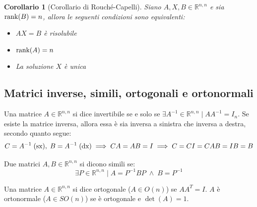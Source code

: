 \documentclass{article}
\newtheorem{corollary}{Corollario}
\begin{document}
    \vspace{10pt}
    \begin{corollary}[Corollario di Rouché-Capelli]
        Siano $A, X, B \in \mathbb{R}^{n, n}$ e sia $\textnormal{rank}(B) = n$, allora le seguenti condizioni sono equivalenti:
        \begin{itemize}
            \item $AX = B$ è risolubile
            \item $\textnormal{rank}(A) = n$
            \item La soluzione $X$ è unica 
        \end{itemize}
    \end{corollary}


\vspace{10pt}
\subsection{Matrici inverse, simili, ortogonali e ortonormali}
    Una matrice $A \in \mathbb{R}^{n, n}$ si dice invertibile se e solo se $\exists A^{-1} \in \mathbb{R}^{n, n} \; | \; AA^{-1} = I_n$. Se esiste la matrice inversa, allora essa è sia inversa a sinistra che inversa a destra, secondo quanto segue:
    \[
        C = A^{-1} \; (\textnormal{sx}), \; B = A^{-1} \; (\textnormal{dx}) \implies CA = AB = I \implies C = CI = CAB = IB = B 
    \]

    Due matrici $A, B \in \mathbb{R}^{n, n}$ si dicono simili se:
    \[
        \exists P \in \mathbb{R}^{n, n} \; | \; A = P^{-1}BP  \; \land \; B = P^{-1} 
    \]

    Una matrice $A \in \mathbb{R}^{n, n}$ si dice ortogonale ($A \in O(n)$) se $AA^{T} = I$. $A$ è ortonormale ($A \in SO(n)$) se è ortogonale e $\det(A) = 1$.
    
\end{document}
